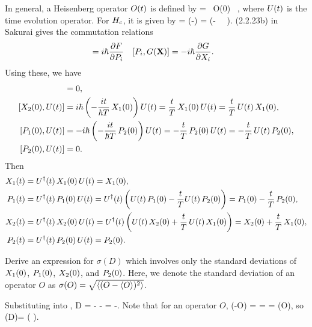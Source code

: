 \begin{solution}
	In general, a Heisenberg operator $O(t)$ is defined by
	\beq
		\Ot = \Udt \, O(0) \, \Ut,
	\eeq
	where $U(t)$ is the time evolution operator.  For $H_c$, it is given by
	\beq
		\Ut = \exp(-) = \exp(- \, \Xqo \, \Pwo).
	\eeq
	(2.2.23b) in Sakurai gives the commutation relations
	\begin{align*}
		[X_i, F(\vec{P})] &= \ihb \pdv{F}{P_i} &
		[P_i, G(\vec{X})] &= -\ihb \pdv{G}{X_i}.
	\end{align*}
	Using these, we have
	\begin{align*}
		[\Xqo, \Ut] &= 0, \\
		[\Xwo, \Ut] &= \ihb \left( -\frac{i t}{\hbar T} \, \Xqo \right) \Ut = \frac{t}{T} \, \Xqo \, \Ut = \frac{t}{T} \, \Ut \, \Xqo, \\
		[\Pqo, \Ut] &= -\ihb \left( -\frac{i t}{\hbar T} \, \Pwo \right) \Ut = -\frac{t}{T} \, \Pwo \, \Ut = -\frac{t}{T} \, \Ut \, \Pwo, \\
		[\Pwo, \Ut] &= 0.
	\end{align*}
	Then
	\begin{align}
		X_1(t) &= U^\dagger(t) \, X_1(0) \, U(t) = X_1(0), \label{Xqt} \\
		P_1(t) &= U^\dagger(t) \, P_1(0) \, U(t) = U^\dagger(t) \left( U(t) \, P_1(0) - \frac{t}{T} U(t) \, P_2(0) \right) = P_1(0) - \frac{t}{T} \, P_2(0), \label{Pqt} \\
		X_2(t) &= U^\dagger(t) \, X_2(0) \, U(t) = U^\dagger(t) \left( U(t) \, X_2(0) + \frac{t}{T} \, U(t) \, X_1(0)  \right) = X_2(0) + \frac{t}{T} \, X_1(0), \label{Xwt} \\
		P_2(t) &= U^\dagger(t) \, P_2(0) \, U(t) = P_2(0). \label{Pwt}
	\end{align}
\end{solution}

\newcommand{\sigD}{\sigma(D)}
\newcommand{\sigN}{\sigma(N)}

\begin{problem}
	Derive an expression for $\sigD$ which involves only the standard deviations of $X_1(0)$, $P_1(0)$, $X_2(0)$, and $P_2(0)$.  Here, we denote the standard deviation of an operator $O$ as $\sigma(O) = \sqrt{\ev{(O - \ev{O})^2}}$.
\end{problem}

\begin{solution}
	Substituting  into ,
	\beq
		D = \Pqo -  \Pwo - \Pwo = -\Pwo.
	\eeq
	Note that for an operator $O$,
	\beq
		\sigma(-O) =  =  = \sigma(O),
	\eeq
	so
	\beqn \label{sigD}
		\sigD = \sigma\big( \Pwo \big).
	\eeqn
\end{solution}

